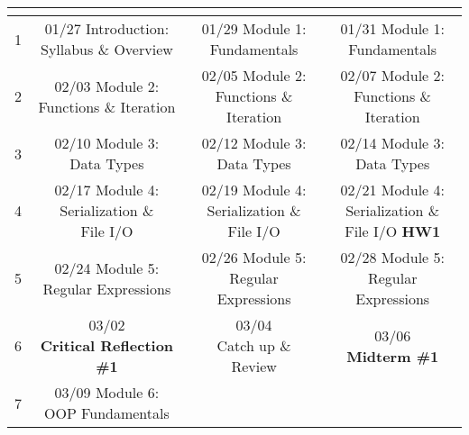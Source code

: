 \documentclass[11pt]{article}
\begin{document}
\begin{tabular}{| r | c | c | c |}
	\hline
	\cellcolor{gray!40} \colorbox{gray!40}{\makecell{Week}} &
	\cellcolor{gray!40} \colorbox{gray!40}{\makecell{Monday}} &
	\cellcolor{gray!40} \colorbox{gray!40}{\makecell{Wednesday}} &
	\cellcolor{gray!40} \colorbox{gray!40}{\makecell{Friday}} \\
	\hline 1 & 
	\makecell{01/27 Introduction: \\Syllabus \& Overview} & 
	\makecell{01/29 Module 1:\\Fundamentals} & 
	\makecell{01/31 Module 1:\\Fundamentals} \\
	\hline 2 & 
	\makecell{02/03 Module 2:\\Functions \& Iteration} & 
	\makecell{02/05 Module 2:\\Functions \& Iteration} & 
	\makecell{02/07 Module 2:\\Functions \& Iteration} \\
	\hline 3 & 
	\makecell{02/10 Module 3:\\Data Types} & 
	\makecell{02/12 Module 3:\\Data Types} & 
	\makecell{02/14 Module 3:\\Data Types} \\
	\hline 4 & 
	\makecell{02/17 Module 4:\\Serialization \& \\File I/O} & 
	\makecell{02/19 Module 4:\\Serialization \& \\File I/O} &
	\makecell{02/21 Module 4:\\Serialization \& \\File I/O \textbf{HW1}} \\
	\hline 5 &
	\makecell{02/24 Module 5:\\Regular Expressions} &
	\makecell{02/26 Module 5:\\Regular Expressions} &
	\makecell{02/28 Module 5:\\Regular Expressions} \\
	\hline 6 &
	\makecell{03/02\\\textbf{Critical Reflection \#1}} &
	\makecell{03/04\\Catch up \& Review} &
	\makecell{03/06\\\textbf{Midterm \#1}} \\
	\hline 7 &	
	\makecell{03/09 Module 6:\\OOP Fundamentals} &

\end{tabular}
\end{document}
